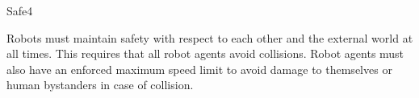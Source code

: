 \begin{nonfunctional_requirement}{Safe}{4}
\label{nfr:safe}
\item Robots must maintain safety with respect to each other and the external world at all times. This requires that all robot agents avoid collisions. Robot agents must also have an enforced maximum speed limit to avoid damage to themselves or human bystanders in case of collision. 
\end{nonfunctional_requirement}

